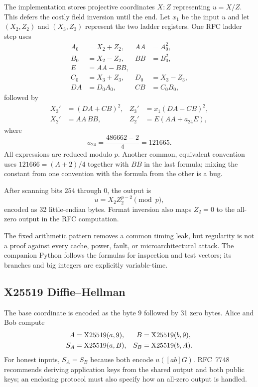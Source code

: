 The implementation stores projective coordinates $X:Z$ representing
$u=X/Z$. This defers the costly field inversion until the end. Let $x_1$ be
the input $u$ and let $(X_2,Z_2)$ and $(X_3,Z_3)$ represent the two ladder
registers. One RFC ladder step uses
\begin{align*}
  A_0&=X_2+Z_2, & AA&=A_0^2,\\
  B_0&=X_2-Z_2, & BB&=B_0^2,\\
  E&=AA-BB,\\
  C_0&=X_3+Z_3, & D_0&=X_3-Z_3,\\
  DA&=D_0A_0, & CB&=C_0B_0,
\end{align*}
followed by
\begin{align*}
  X_3'&=(DA+CB)^2,&
  Z_3'&=x_1(DA-CB)^2,\\
  X_2'&=AA\,BB,&
  Z_2'&=E(AA+a_{24}E),
\end{align*}
where
\[
  a_{24}=\frac{486662-2}{4}=121665.
\]
All expressions are reduced modulo $p$. Another common, equivalent convention
uses $121666=(A+2)/4$ together with $BB$ in the last formula; mixing the
constant from one convention with the formula from the other is a bug.

After scanning bits $254$ through $0$, the output is
\[
  u=X_2Z_2^{p-2}\pmod p,
\]
encoded as 32 little-endian bytes. Fermat inversion also maps $Z_2=0$ to the
all-zero output in the RFC computation.

The fixed arithmetic pattern removes a common timing leak, but regularity is
not a proof against every cache, power, fault, or microarchitectural attack.
The companion Python follows the formulas for inspection and test vectors; its
branches and big integers are explicitly variable-time.

\subsection{X25519 Diffie--Hellman}

The base coordinate is encoded as the byte $9$ followed by 31 zero bytes.
Alice and Bob compute
\begin{align*}
  A&=\operatorname{X25519}(a,9), & B&=\operatorname{X25519}(b,9),\\
  S_A&=\operatorname{X25519}(a,B), & S_B&=\operatorname{X25519}(b,A).
\end{align*}
For honest inputs, $S_A=S_B$ because both encode $u([ab]G)$. RFC~7748
recommends deriving application keys from the shared output and both public
keys; an enclosing protocol must also specify how an all-zero output is
handled.
